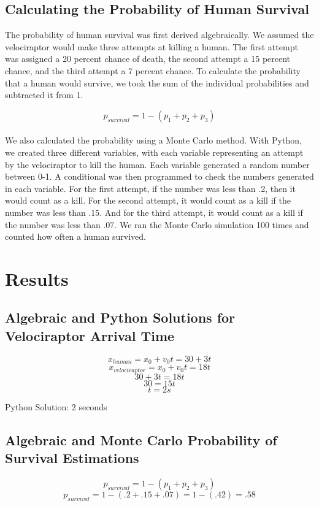 \documentclass[twocolumn]{revtex4}
\begin{document}
\subsection{Calculating the Probability of Human Survival}
The probability of human survival was first derived algebraically. We assumed the velociraptor would make three attempts at killing a human. The first attempt was assigned a 20 percent chance of death, the second attempt a 15 percent chance, and the third attempt a 7 percent chance. To calculate the probability that a human would survive, we took the sum of the individual probabilities and subtracted it from 1.

$$p_{survival} = 1-(p_{1}+p_{2}+p_{3})$$\\

We also calculated the probability using a Monte Carlo method. With Python, we created three different variables, with each variable representing an attempt by the velociraptor to kill the human. Each variable generated a random number between 0-1. A conditional was then programmed to check the numbers generated in each variable. For the first attempt, if the number was less than .2, then it would count as a kill. For the second attempt, it would count as a kill if the number was less than .15. And for the third attempt, it would count as a kill if the number was less than .07. We ran the Monte Carlo simulation 100 times and counted how often a human survived. 


\section{Results}
\subsection{Algebraic and Python Solutions for Velociraptor Arrival Time}
$$x_{human} = x_0 + v_0 t = 30 + 3t$$
$$x_{velociraptor} = x_0 + v_0 t = 18t$$
$$30 + 3t = 18t$$
$$30 = 15t$$
$$t = 2s$$

Python Solution: 2 seconds

\subsection{Algebraic and Monte Carlo Probability of Survival Estimations}
$$p_{survival} = 1-(p_{1}+p_{2}+p_{3})$$
$$p_{survival} = 1-(.2+.15+.07) = 1-(.42) = .58$$
\end{document}
